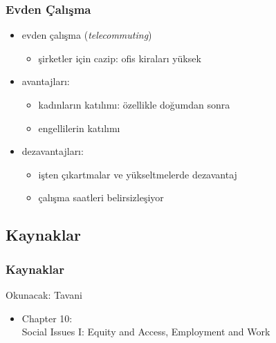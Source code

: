 \documentclass[dvipsnames]{beamer}
\theoremstyle{definition}
\theoremstyle{example}
\theoremstyle{plain}
\begin{document}
\begin{frame}
  \frametitle{Evden Çalışma}

  \begin{itemize}
    \item evden çalışma (\emph{telecommuting})
    \begin{itemize}
      \item şirketler için cazip: ofis kiraları yüksek
    \end{itemize}

    \medskip
    \item avantajları:
    \begin{itemize}
      \item kadınların katılımı: özellikle doğumdan sonra
      \item engellilerin katılımı
    \end{itemize}

    \pause
    \medskip
    \item dezavantajları:
    \begin{itemize}
      \item işten çıkartmalar ve yükseltmelerde dezavantaj
      \item çalışma saatleri belirsizleşiyor
    \end{itemize}
  \end{itemize}
\end{frame}

\subsection*{Kaynaklar}

\begin{frame}
  \frametitle{Kaynaklar}

  \begin{block}{Okunacak: Tavani}
    \begin{itemize}
      \item Chapter 10:\\
        \alert{Social Issues I: Equity and Access, Employment and Work}
    \end{itemize}
  \end{block}
\end{frame}
\end{document}
